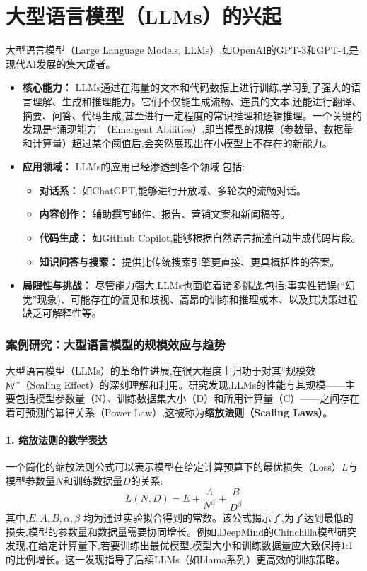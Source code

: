 \section{大型语言模型（LLMs）的兴起}
\label{sec:llms}
大型语言模型（Large Language Models, LLMs）,如OpenAI的GPT-3和GPT-4,是现代AI发展的集大成者。
\begin{itemize}
    \item \textbf{核心能力：} LLMs通过在海量的文本和代码数据上进行训练,学习到了强大的语言理解、生成和推理能力。它们不仅能生成流畅、连贯的文本,还能进行翻译、摘要、问答、代码生成,甚至进行一定程度的常识推理和逻辑推理。一个关键的发现是“涌现能力”（Emergent Abilities）,即当模型的规模（参数量、数据量和计算量）超过某个阈值后,会突然展现出在小模型上不存在的新能力。
    \item \textbf{应用领域：} LLMs的应用已经渗透到各个领域,包括:
        \begin{itemize}
            \item \textbf{对话系：} 如ChatGPT,能够进行开放域、多轮次的流畅对话。
            \item \textbf{内容创作：} 辅助撰写邮件、报告、营销文案和新闻稿等。
            \item \textbf{代码生成：} 如GitHub Copilot,能够根据自然语言描述自动生成代码片段。
            \item \textbf{知识问答与搜索：} 提供比传统搜索引擎更直接、更具概括性的答案。
        \end{itemize}
    \item \textbf{局限性与挑战：} 尽管能力强大,LLMs也面临着诸多挑战,包括:事实性错误(“幻觉”现象)、可能存在的偏见和歧视、高昂的训练和推理成本、以及其决策过程缺乏可解释性等。
\end{itemize}

\subsubsection*{案例研究：大型语言模型的规模效应与趋势}
\label{sssec:llm_case_study}
大型语言模型（LLMs）的革命性进展,在很大程度上归功于对其“规模效应”（Scaling Effect）的深刻理解和利用。研究发现,LLMs的性能与其规模——主要包括模型参数量（N）、训练数据集大小（D）和所用计算量（C）——之间存在着可预测的幂律关系（Power Law）,这被称为\textbf{缩放法则（Scaling Laws）}。

\paragraph{1. 缩放法则的数学表达}
一个简化的缩放法则公式可以表示模型在给定计算预算下的最优损失（Loss）$L$与模型参数量$N$和训练数据量$D$的关系:
$$ L(N, D) = E + \frac{A}{N^\alpha} + \frac{B}{D^\beta} $$
其中,$E, A, B, \alpha, \beta$ 均为通过实验拟合得到的常数。该公式揭示了,为了达到最低的损失,模型的参数量和数据量需要协同增长。例如,DeepMind的Chinchilla模型研究发现,在给定计算量下,若要训练出最优模型,模型大小和训练数据量应大致保持1:1的比例增长。这一发现指导了后续LLMs（如Llama系列）更高效的训练策略。

